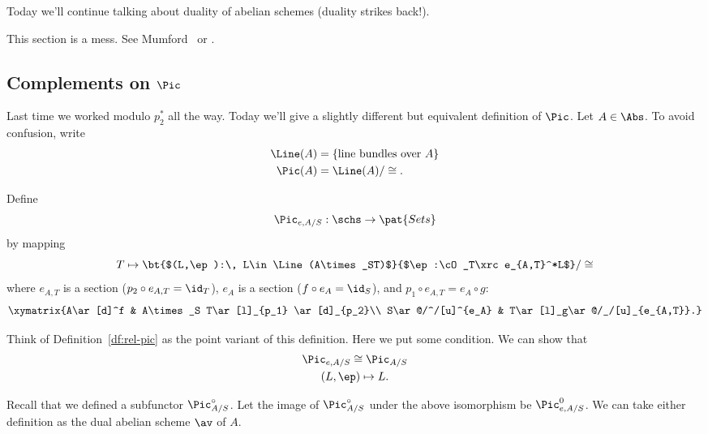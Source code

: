 
Today we'll continue talking about duality of abelian schemes (duality strikes back!). 

This section is a mess. See Mumford~\cite[\S13]{Mu70} or \cite[\S7.2]{GGBM}.

\subsection{Complements on $\Pic$}

Last time we worked modulo $p_2^*$ all the way. Today we'll give a slightly different but equivalent definition of $\Pic$. Let $A\in \Abs$. To avoid confusion, write
\begin{align*}
\Line(A)&=\{\text{line bundles over }A\}\\
\Pic(A)&=\Line(A)/\cong.
\end{align*}
\begin{df}
Define 
\[
\Pic_{e,A/S}:\schs\to \pat{Sets}
\]
by mapping
\[
T\mapsto \bt{$(L,\ep):\, L\in \Line(A\times_ST)$}{$\ep:\cO_T\xrc e_{A,T}^*L$}/\cong
\]
where $e_{A,T}$ is a section ($p_2\circ e_{A,T}=\id_T$), $e_A$ is a section ($f\circ e_A=\id_S$), and $p_1\circ e_{A,T}=e_A\circ g$:
\[
\xymatrix{A\ar[d]^f & A\times_S T\ar[l]_{p_1} \ar[d]_{p_2}\\
S\ar@/^/[u]^{e_A} & T\ar[l]_g\ar@/_/[u]_{e_{A,T}}.}
\]
\end{df}
Think of Definition~\ref{df:rel-pic} as the point variant of this definition. Here we put some condition. We  can show that
\begin{gather*}
\Pic_{e,A/S}\cong \Pic_{A/S}\\
(L,\ep)\mapsto L.
\end{gather*}

Recall that we defined a subfunctor $\Pic_{A/S}^{\circ}$. Let the image of $\Pic_{A/S}^{\circ}$ under the above isomorphism be $\Pic_{e,A/S}^0$. We can take either definition as the dual abelian scheme $\av$ of $A$.

